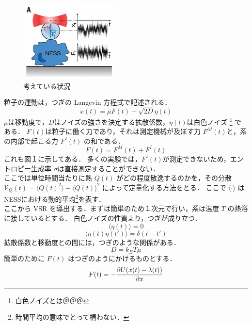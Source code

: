 \documentclass{jsarticle}
\numberwithin{equation}{section}
\theoremstyle{definition}
\newcommand{\ave}[1]{\langle #1 \rangle}
\begin{document}
\begin{figure}[H]
  \begin{center}  
  \includegraphics[width=5cm]{vsr_fig1a.png}  
  \end{center}
  \caption{考えている状況}
\end{figure}

粒子の運動は，つぎの Langevin 方程式で記述される．
\begin{equation}
  \dot{x}(t) = \mu F(t) + \sqrt{2D} \eta(t)
\end{equation}
$\mu $は移動度で，$D$はノイズの強さを決定する拡散係数，$\eta (t)$は白色ノイズ \footnote{白色ノイズとは＠＠＠} である．
$F(t)$は粒子に働く力であり，それは測定機械が及ぼす力 $F^M (t)$と，系の内部で起こる力 $F^I (t)$ の和である．
\begin{equation}
  F(t) = F^M (t) + F^I (t)
\end{equation}
これも図１に示してある．
多くの実験では，$F^I (t)$が測定できないため，エントロピー生成率 $\sigma $は直接測定することができない．\\
\quad ここでは単位時間当たりに熱 $Q(t)$ がどの程度散逸するのかを，その分散 $\mathcal{V} _Q (t) = \langle Q(t)^2 \rangle - \langle Q(t) \rangle^2 $ によって定量化する方法をとる．
ここで $\langle \cdot \rangle $ はNESSにおける動的平均\footnote{時間平均の意味でとって構わない．}を表す．\\
\quad ここから VSR を導出する．まずは簡単のため１次元で行い，系は温度 $T$ の熱浴に接しているとする．
白色ノイズの性質より，つぎが成り立つ．
\begin{equation}
  \ave{\eta (t)} = 0
\end{equation}
\begin{equation}
  \label{gauss_2}
  \ave{\eta (t) \eta(t')} = \delta (t-t')
\end{equation}
拡散係数と移動度との間には，つぎのような関係がある．
\begin{equation}
  D = k_B T \mu
\end{equation}
簡単のために $F(t)$ はつぎのようにかけるものとする．
\begin{equation}
  F(t) = - \pdv{U(x(t) - \lambda (t))}{x}
\end{equation}
\end{document}
